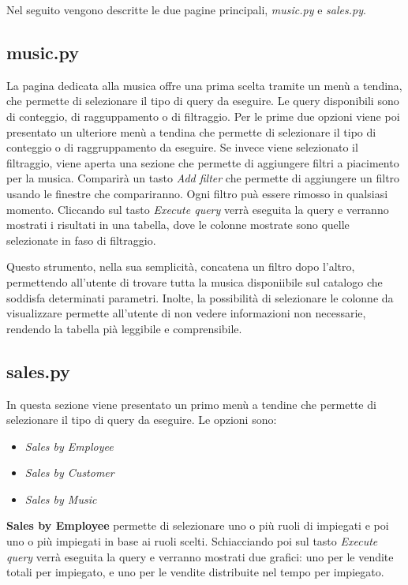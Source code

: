 \documentclass{article}
\begin{document}
Nel seguito vengono descritte le due pagine principali, \textit{music.py} e \textit{sales.py}.

\subsection{music.py}
La pagina dedicata alla musica offre una prima scelta tramite un menù a tendina, che permette di selezionare il tipo di query da eseguire.
Le query disponibili sono di conteggio, di ragguppamento o di filtraggio. Per le prime due opzioni viene poi presentato un ulteriore menù
a tendina che permette di selezionare il tipo di conteggio o di raggruppamento da eseguire. Se invece viene selezionato il filtraggio,
viene aperta una sezione che permette di aggiungere filtri a piacimento per la musica. Comparirà un tasto \textit{Add filter} che permette di aggiungere
un filtro usando le finestre che compariranno. Ogni filtro puà essere rimosso in qualsiasi momento. Cliccando sul tasto \textit{Execute query} 
verrà eseguita la query e verranno mostrati i risultati in una tabella, dove le colonne mostrate sono quelle selezionate in faso di filtraggio.

Questo strumento, nella sua semplicità, concatena un filtro dopo l'altro, permettendo all'utente di trovare tutta la musica disponiibile sul 
catalogo che soddisfa determinati parametri. Inolte, la possibilità di selezionare le colonne da visualizzare permette all'utente di 
non vedere informazioni non necessarie, rendendo la tabella pià leggibile e comprensibile.

\subsection{sales.py}
In questa sezione viene presentato un primo menù a tendine che permette di selezionare il tipo di query da eseguire. Le opzioni sono:
\begin{itemize}
    \item \textit{Sales by Employee}
    \item \textit{Sales by Customer}
    \item \textit{Sales by Music}
\end{itemize}

\textbf{Sales by Employee} permette di selezionare uno o più ruoli di impiegati e poi uno o più impiegati in base ai ruoli scelti. Schiacciando poi sul tasto
\textit{Execute query} verrà eseguita la query e verranno mostrati due grafici: uno per le vendite totali per impiegato, e uno per le vendite distribuite nel tempo per impiegato.
\end{document}
